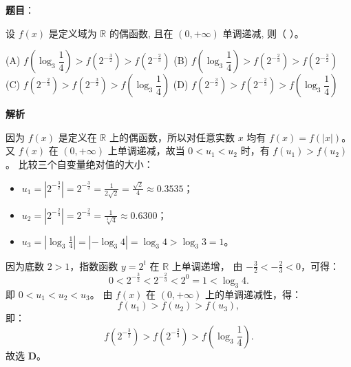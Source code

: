 \begin{answer}

\textbf{题目}：

设 $f(x)$ 是定义域为 $\mathbb{R}$ 的偶函数, 且在 $(0, +\infty)$ 单调递减, 则（ ）。

(A) $f\left(\log_3 \dfrac{1}{4}\right) > f\left(2^{-\frac{3}{2}}\right) > f\left(2^{-\frac{2}{3}}\right)$  
(B) $f\left(\log_3 \dfrac{1}{4}\right) > f\left(2^{-\frac{2}{3}}\right) > f\left(2^{-\frac{3}{2}}\right)$  
(C) $f\left(2^{-\frac{2}{3}}\right) > f\left(2^{-\frac{3}{2}}\right) > f\left(\log_3 \dfrac{1}{4}\right)$  
(D) $f\left(2^{-\frac{3}{2}}\right) > f\left(2^{-\frac{2}{3}}\right) > f\left(\log_3 \dfrac{1}{4}\right)$

\textbf{解析}

因为 $f(x)$ 是定义在 $\mathbb{R}$ 上的偶函数，所以对任意实数 $x$ 均有 $f(x) = f(|x|)$。
又 $f(x)$ 在 $(0, +\infty)$ 上单调递减，故当 $0 < u_1 < u_2$ 时，有 $f(u_1) > f(u_2)$。
比较三个自变量绝对值的大小：
\begin{itemize}
\item $u_1 = \left|2^{-\frac{3}{2}}\right| = 2^{-\frac{3}{2}} = \frac{1}{2\sqrt{2}} = \frac{\sqrt{2}}{4} \approx 0.3535$；
\item $u_2 = \left|2^{-\frac{2}{3}}\right| = 2^{-\frac{2}{3}} = \frac{1}{\sqrt[3]{4}} \approx 0.6300$；
\item $u_3 = \left|\log_3 \frac{1}{4}\right| = |-\log_3 4| = \log_3 4 > \log_3 3 = 1$。
\end{itemize}
因为底数 $2 > 1$，指数函数 $y = 2^t$ 在 $\mathbb{R}$ 上单调递增，
由 $-\frac{3}{2} < -\frac{2}{3} < 0$，可得：
\nopagebreak[4]
\[0 < 2^{-\frac{3}{2}} < 2^{-\frac{2}{3}} < 2^0 = 1 < \log_3 4.\]
即 $0 < u_1 < u_2 < u_3$。
由 $f(x)$ 在 $(0, +\infty)$ 上的单调递减性，得：
\nopagebreak[4]
\[f(u_1) > f(u_2) > f(u_3),\]
即：
\nopagebreak[4]
\[f\left(2^{-\frac{3}{2}}\right) > f\left(2^{-\frac{2}{3}}\right) > f\left(\log_3 \frac{1}{4}\right).\]
故选 \textbf{D}。


\par\medskip

\end{answer}

